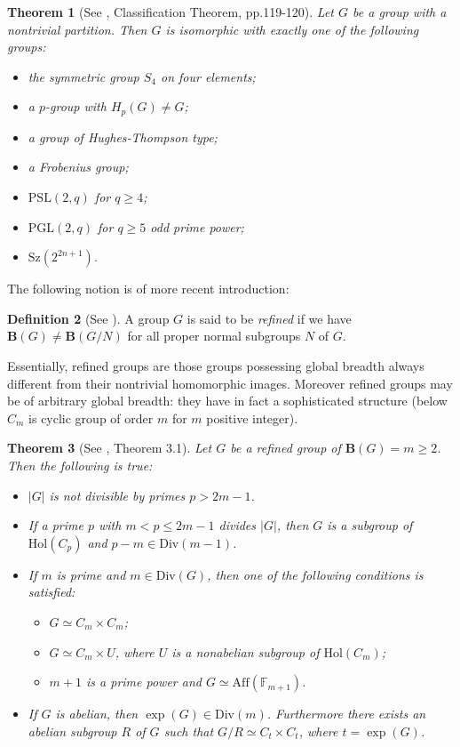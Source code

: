 \documentclass{amsart}
\newtheorem{theorem}{Theorem}[section]
\theoremstyle{definition}
\newtheorem{definition}[theorem]{Definition}
\numberwithin{equation}{section}
\begin{document}
\begin{theorem}[See \cite{mf},  Classification Theorem, pp.119-120]\label{niceclassification}Let $G$ be a  group with
 a nontrivial partition. Then $G$ is isomorphic with exactly one of the following groups:
\begin{itemize}
\item [(i).] the symmetric group $S_4$ on four elements;
\item [(ii).] a $p$-group with $H_p(G) \neq G$;
\item [(iii).] a group of Hughes-Thompson type;
\item [(iv).] a Frobenius group;
\item [(v).]  $\mathrm{PSL}(2,q)$ for $q \ge 4  $;
\item [(vi).]  $\mathrm{PGL}(2,q)$ for $q \ge 5$ odd prime power;
\item [(vii).] $\mathrm{Sz}(2^{2n+1})$.
\end{itemize}
\end{theorem}

The following notion is of more recent introduction:

\begin{definition}[See \cite{hr2}]\label{refined} A group $G$ is said to be \textit{refined} if we have  $\mathbf{B}(G) \neq \mathbf{B}(G/N )$ for all proper normal subgroups $N$ of $G$. 
\end{definition}

Essentially, refined groups are those groups possessing global breadth always different from their nontrivial homomorphic images. Moreover refined groups may be of arbitrary global breadth: they have in fact  a  sophisticated structure (below $C_m$ is cyclic group of order $m$ for $m$ positive integer).


\begin{theorem}[See \cite{hr2}, Theorem 3.1] \label{anidea}
Let  $G$ be a refined group of $\mathbf{ B}(G) = m \ge 2$. Then the following is true:
\begin{itemize}
\item[(i).]  $|G|$ is not divisible by primes $p > 2m-1$.
\item[(ii).] If a prime $p$ with $m < p \le 2m-1$ divides $|G|$, then $G$ is a subgroup of  $\mathrm{Hol}(C_p)$  and $p-m \in  \mathrm{Div} (m-1)$.
\item[(iii).] If $m$ is prime and $m \in \mathrm{Div}(G)$, then one of the following conditions  is satisfied:  
\begin{itemize}
\item[(1).] $G \simeq C_m \times C_m$; 
\item[(2).] $G \simeq C_m \times U$, where $U$ is a nonabelian subgroup of $\mathrm{Hol}(C_m)$;
\item[(3).] $m+1$ is a prime power and $G \simeq \mathrm{Aff}(\mathbb{F}_{m+1})$.    
\end{itemize}
\item[(iv).] If $G$ is abelian, then $ \exp(G) \in \mathrm{Div}(m)$. Furthermore there exists an abelian subgroup $R$ of $G$ such that $G/R \simeq C_t \times C_t$, where $t = \exp(G)$.
\end{itemize}
\end{theorem}
\end{document}
